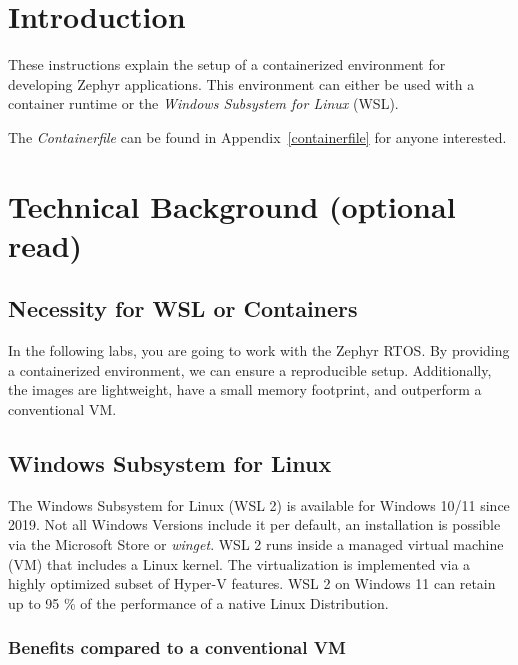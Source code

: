 



\puttitle{}

\section{Introduction}

These instructions explain the setup of a containerized environment for developing Zephyr applications.
This environment can either be used with a container runtime or the \emph{Windows Subsystem for Linux} (WSL).

The \emph{Containerfile} can be found in Appendix~\ref{containerfile} for anyone interested.



\section{Technical Background (optional read)}

\subsection{Necessity for WSL or Containers}

In the following labs, you are going to work with the Zephyr RTOS.
By providing a containerized environment, we can ensure a reproducible setup.
Additionally, the images are lightweight, have a small memory footprint, and outperform a conventional VM.

\subsection{Windows Subsystem for Linux}

The Windows Subsystem for Linux (WSL 2) is available for Windows 10/11 since 2019.
Not all Windows Versions include it per default, an installation is possible via the Microsoft Store or \emph{winget}.
WSL 2 runs inside a managed virtual machine (VM) that includes a Linux kernel.
The virtualization is implemented via a highly optimized subset of Hyper-V features.
WSL 2 on Windows 11 can retain up to 95 \% of the performance of a native Linux Distribution.

\subsubsection*{Benefits compared to a conventional VM}


